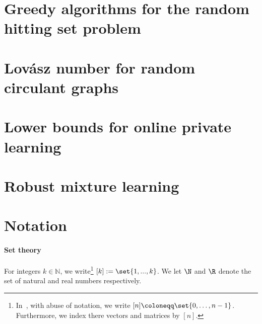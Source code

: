 \section{Greedy algorithms for the random hitting set problem}



\section{Lovász number for random circulant graphs}


% 

\section{Lower bounds for online private learning}


\section{Robust mixture learning}




\section{Notation}\label{sec:notation}

\paragraph*{Set theory}
For integers $k \in \mathbb{N}$, we write\footnote{In~, with abuse of notation, we write \([n] \coloneqq \set{0, \ldots, n - 1}\). Furthermore, we index there vectors and matrices by \([n]\).} $[k]:=\set{1,...,k}$. 
We let \(\N\) and \(\R\) denote the set of natural and real numbers respectively.  

